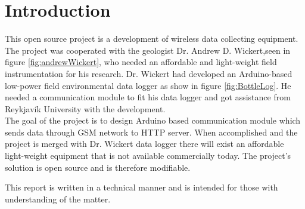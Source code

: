 \section*{Introduction}
This open source project is a development of wireless data collecting equipment. The project was cooperated with the geologist Dr. Andrew D. Wickert,seen in figure \ref{fig:andrewWickert}, who needed an affordable and light-weight field instrumentation for his research. Dr. Wickert had developed an Arduino-based low-power field environmental data logger as show in figure \ref{fig:BottleLog}. He needed a communication module to fit his data logger and got assistance from Reykjavík University with the development.\\
The goal of the project is to design Arduino based communication module which sends data through GSM network to HTTP server. When accomplished and the project is merged with Dr. Wickert data logger there will exist an affordable light-weight equipment that is not available commercially today. The project's solution is open source and is therefore modifiable.

This report is written in a technical manner and is intended for those with understanding of the matter.